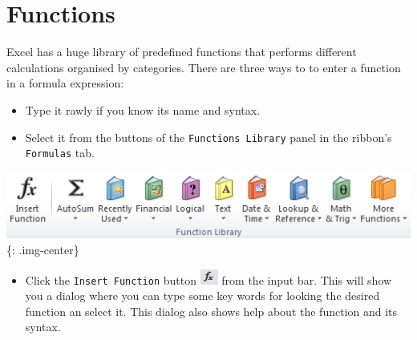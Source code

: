 \chapter{Functions}
\label{functions}

Excel has a huge library of predefined functions that performs different calculations organised by categories. There are three ways to to enter a function in a formula expression:

\begin{itemize}
\item Type it rawly if you know its name and syntax.

\item Select it from the buttons of the \texttt{Functions Library} panel in the ribbon's \texttt{Formulas} tab.

\end{itemize}

\includegraphics[keepaspectratio,width=\textwidth,height=0.75\textheight]{img/panel_formulas.png}
\{: .img-center\}

\begin{itemize}
\item Click the \texttt{Insert Function} button \includegraphics[keepaspectratio,width=\textwidth,height=0.75\textheight]{img/button_insert_function.png}
 from the input bar. This will show you a dialog where you can type some key words for looking the desired function an select it. This dialog also shows help about the function and its syntax.

\end{itemize}

